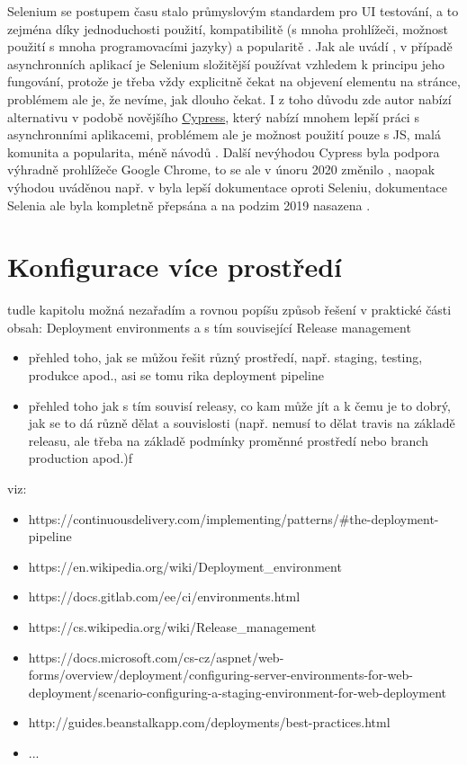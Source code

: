 Selenium se postupem času stalo průmyslovým standardem pro UI testování, a to zejména díky jednoduchosti použití, kompatibilitě (s mnoha prohlížeči, možnost použití s mnoha programovacími jazyky) a popularitě \cite{test-selenium1}. Jak ale uvádí \cite{test-cypress1}, v případě asynchronních aplikací je Selenium složitější používat vzhledem k principu jeho fungování, protože je třeba vždy explicitně čekat na objevení elementu na stránce, problémem ale je, že nevíme, jak dlouho čekat. I z toho důvodu zde autor nabízí alternativu v podobě novějšího \href{https://www.cypress.io/}{Cypress}, který nabízí mnohem lepší práci s asynchronními aplikacemi, problémem ale je možnost použití pouze s JS, malá komunita a popularita, méně návodů \cite{test-cypress1}. Další nevýhodou Cypress byla podpora výhradně prohlížeče Google Chrome, to se ale v únoru 2020 změnilo \cite{test-cypress2}, naopak výhodou uváděnou např. v \cite{test-cypress3} byla lepší dokumentace oproti Seleniu, dokumentace Selenia ale byla kompletně přepsána a na podzim 2019 nasazena \cite{test-selenium2}.

\chapter{Konfigurace více prostředí}

tudle kapitolu možná nezařadím a rovnou popíšu způsob řešení v praktické části
obsah: Deployment environments a s tím související Release management

\begin{itemize}
\item přehled toho, jak se můžou řešit různý prostředí, např. staging, testing, produkce apod., asi se tomu rika deployment pipeline
\end{itemize}
\begin{itemize}
\item přehled toho jak s tím souvisí releasy, co kam může jít a k čemu je to dobrý, jak se to dá různě dělat a souvislosti (např. nemusí to dělat travis na základě releasu, ale třeba na základě podmínky proměnné prostředí nebo branch production apod.)f
\end{itemize}

viz:

\begin{itemize}
\item https://continuousdelivery.com/implementing/patterns/\#the-deployment-pipeline
\item https://en.wikipedia.org/wiki/Deployment\_environment
\item https://docs.gitlab.com/ee/ci/environments.html
\item https://cs.wikipedia.org/wiki/Release\_management
\item https://docs.microsoft.com/cs-cz/aspnet/web-forms/overview/deployment/configuring-server-environments-for-web-deployment/scenario-configuring-a-staging-environment-for-web-deployment
\item http://guides.beanstalkapp.com/deployments/best-practices.html
\item ...
\end{itemize}

